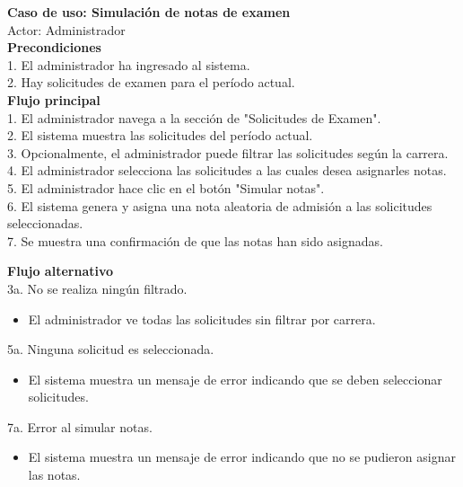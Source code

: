 \documentclass[12pt,a4paper]{article}
\begin{document}
\begin{tcolorbox}[colback=white, colframe=black, rounded corners]
  {\Large \textbf{Caso de uso: Simulación de notas de examen}} \\
  {\large Actor: Administrador} \vspace*{0.5cm} \\
  {{\large \textbf{Precondiciones}} \\
  1. El administrador ha ingresado al sistema. \\
  2. Hay solicitudes de examen para el período actual.
  } \vspace*{0.5cm} \\
  {{\large \textbf{Flujo principal}} \\
  1. El administrador navega a la sección de "Solicitudes de Examen". \\
  2. El sistema muestra las solicitudes del período actual. \\
  3. Opcionalmente, el administrador puede filtrar las solicitudes según la carrera. \\
  4. El administrador selecciona las solicitudes a las cuales desea asignarles notas. \\
  5. El administrador hace clic en el botón "Simular notas". \\
  6. El sistema genera y asigna una nota aleatoria de admisión a las solicitudes seleccionadas. \\
  7. Se muestra una confirmación de que las notas han sido asignadas.
  } \vspace*{0.5cm} \\
  {{\large \textbf{Flujo alternativo}} \\
  3a. No se realiza ningún filtrado.
  \begin{itemize}
    \item El administrador ve todas las solicitudes sin filtrar por carrera.
  \end{itemize}
  5a. Ninguna solicitud es seleccionada.
  \begin{itemize}
    \item El sistema muestra un mensaje de error indicando que se deben seleccionar solicitudes.
  \end{itemize}
  7a. Error al simular notas.
  \begin{itemize}
    \item El sistema muestra un mensaje de error indicando que no se pudieron asignar las notas.
  \end{itemize}
}
\end{tcolorbox}
\end{document}

